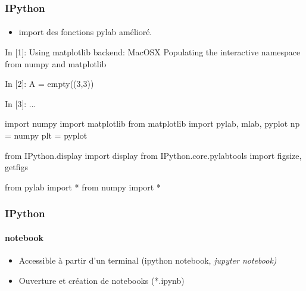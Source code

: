 \begin{frame}[fragile]
\frametitle{IPython}
\framesubtitle{}
\begin{itemize}
 \item import des fonctions pylab amélioré. 
\end{itemize}

\begin{pythonConsole}
In [1]: %
Using matplotlib backend: MacOSX
Populating the interactive namespace from numpy and matplotlib

In [2]: A = empty((3,3))

In [3]: %
...

    import numpy
    import matplotlib
    from matplotlib import pylab, mlab, pyplot
    np = numpy
    plt = pyplot

    from IPython.display import display
    from IPython.core.pylabtools import figsize, getfigs

    from pylab import *
    from numpy import *
\end{pythonConsole}
\end{frame}
\begin{frame}[fragile]
\frametitle{IPython}
\framesubtitle{notebook}
\begin{itemize}
 \item Accessible à partir d'un terminal (ipython notebook, \em{jupyter notebook}) 
 \item Ouverture et création de notebooks (*.ipynb)
\end{itemize}
\begin{center}
\end{center}
\end{frame}
